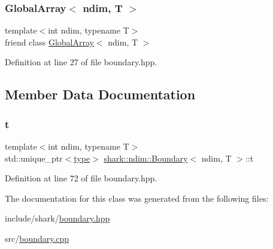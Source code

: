 \subsubsection{\texorpdfstring{Global\+Array$<$ ndim, T $>$}{GlobalArray< ndim, T >}}
{\footnotesize\ttfamily template$<$int ndim, typename T$>$ \\
friend class \hyperlink{classshark_1_1ndim_1_1_global_array}{Global\+Array}$<$ ndim, T $>$\hspace{0.3cm}{\ttfamily [friend]}}



Definition at line 27 of file boundary.\+hpp.



\subsection{Member Data Documentation}
\hypertarget{classshark_1_1ndim_1_1_boundary_a16fdfa33d88480b4127ff36c1f1a2ce7}{}\label{classshark_1_1ndim_1_1_boundary_a16fdfa33d88480b4127ff36c1f1a2ce7} 
\subsubsection{\texorpdfstring{t}{t}}
{\footnotesize\ttfamily template$<$int ndim, typename T$>$ \\
std\+::unique\+\_\+ptr$<$\hyperlink{classshark_1_1ndim_1_1_boundary_1_1type}{type}$>$ \hyperlink{classshark_1_1ndim_1_1_boundary}{shark\+::ndim\+::\+Boundary}$<$ ndim, T $>$\+::t\hspace{0.3cm}{\ttfamily [private]}}



Definition at line 72 of file boundary.\+hpp.



The documentation for this class was generated from the following files\+:\begin{DoxyCompactItemize}
\item 
include/shark/\hyperlink{boundary_8hpp}{boundary.\+hpp}\item 
src/\hyperlink{boundary_8cpp}{boundary.\+cpp}\end{DoxyCompactItemize}
